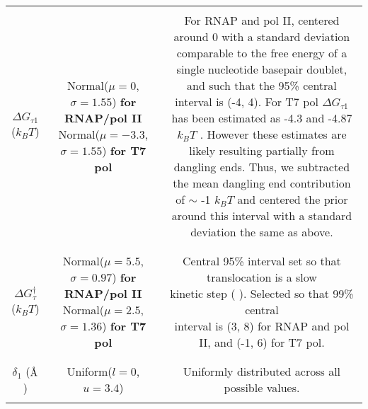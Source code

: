 \documentclass[10pt,letterpaper]{article}
\newcommand{\angstrom}{\mbox{\normalfont\AA}}
\begin{document}
\begin{table}[!htb]
\begin{adjustwidth}{-2.25in}{0in}
{\begin{tabular}{|ccc|}
&&\\
\hline
&&\\


$\Delta G_{\tau 1}$ ($k_B T$) & \makecell{ Normal($\mu = 0$, $\sigma = 1.55$) \textbf{for RNAP/pol II} \\ Normal($\mu = -3.3$, $\sigma = 1.55$) \textbf{for T7 pol}}  & \makecell{For RNAP and pol II, centered around 0 with a standard \\ deviation comparable to the free energy of a single nucleotide \\ basepair doublet, and such that the 95\% central interval is (-4, 4). \\ For T7 pol $\Delta G_{\tau 1}$ has been estimated as -4.3 \cite{thomen2005unravelling} and \\ -4.87   $k_BT$ \cite{yin2004structural}. However these estimates are likely resulting \\ partially from dangling ends. Thus, we subtracted the mean \\ dangling end contribution of $\sim$ -1 $k_BT$ \cite{santalucia1998unified} and centered the prior \\ around this interval with a standard deviation the same as above.
} \\

&&\\
\hline
&&\\

$\Delta G^\dag_{\tau}$ ($k_B T$) & \makecell{ Normal($\mu = 5.5$, $\sigma = 0.97$) \textbf{for RNAP/pol II} \\ Normal($\mu = 2.5$, $\sigma = 1.36$) \textbf{for T7 pol} } & \makecell{ Central 95\% interval set so that translocation is a slow \\ kinetic step (\nameref{S4_Appendix} ). Selected so that 99\% central \\ interval is (3, 8) for RNAP and pol II, and (-1, 6) for T7 pol.}  \\

&&\\
\hline
&&\\



$\delta_1$ ($\angstrom$) & Uniform($l = 0$, $u = 3.4$) & Uniformly distributed across all possible values. \\

&&\\
\hline



\end{tabular}

}
\end{adjustwidth}
\end{table}
\end{document}
